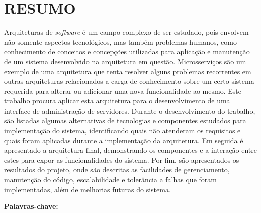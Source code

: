 \chapter*{RESUMO}

\noindent Arquiteturas de \emph{software} é um campo complexo de ser estudado,
pois envolvem não somente aspectos tecnológicos, mas também problemas
humanos, como conhecimento de conceitos e concepções utilizadas para
aplicação e manutenção de um sistema desenvolvido na arquitetura em questão.
Microsserviços são um exemplo de uma arquitetura que tenta resolver alguns
problemas recorrentes em outras arquiteturas relacionados a carga de
conhecimento sobre um certo sistema requerida para alterar ou adicionar uma
nova funcionalidade ao mesmo. Este trabalho procura aplicar esta
arquitetura para o desenvolvimento de uma interface de administração de
servidores. Durante o desenvolvimento do trabalho, são listadas algumas
alternativas de tecnologias e componentes estudados para implementação
do sistema, identificando quais não atenderam os requisitos e quais
foram aplicadas durante a implementação da arquitetura. Em seguida é
apresentado a arquitetura final, demonstrando os componentes e a
interação entre estes para expor as funcionalidades do sistema. Por
fim, são apresentados os resultados do projeto, onde são descritas as
facilidades de gerenciamento, manutenção do código, escalabilidade e
tolerância a falhas que foram implementadas, além de melhorias futuras
do sistema.

\newline\newline\noindent \textbf{Palavras-chave:} \ptBRKeyword
